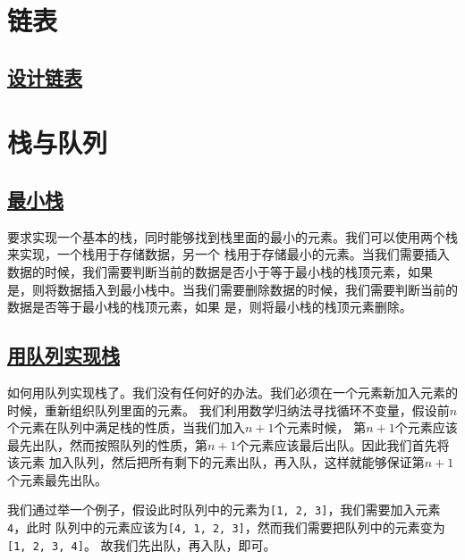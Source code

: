 \documentclass[../../main.tex]{subfiles}
\begin{document}
\section{链表}

\subsection{\href{https://leetcode.cn/problems/design-linked-list/}{设计链表}}



\section{栈与队列}

\subsection{\href{https://leetcode-cn.com/problems/min-stack/}{最小栈}}

要求实现一个基本的栈，同时能够找到栈里面的最小的元素。我们可以使用两个栈来实现，一个栈用于存储数据，另一个
栈用于存储最小的元素。当我们需要插入数据的时候，我们需要判断当前的数据是否小于等于最小栈的栈顶元素，如果
是，则将数据插入到最小栈中。当我们需要删除数据的时候，我们需要判断当前的数据是否等于最小栈的栈顶元素，如果
是，则将最小栈的栈顶元素删除。



\subsection{\href{https://leetcode.cn/problems/implement-stack-using-queues/}{用队列实现栈}}

如何用队列实现栈了。我们没有任何好的办法。我们必须在一个元素新加入元素的时候，重新组织队列里面的元素。
我们利用数学归纳法寻找循环不变量，假设前$n$个元素在队列中满足栈的性质，当我们加入$n + 1$个元素时候，
第$n + 1$个元素应该最先出队，然而按照队列的性质，第$n + 1$个元素应该最后出队。因此我们首先将该元素
加入队列，然后把所有剩下的元素出队，再入队，这样就能够保证第$n + 1$个元素最先出队。

\begin{example}
  我们通过举一个例子，假设此时队列中的元素为\texttt{[1, 2, 3]}，我们需要加入元素\texttt{4}，此时
  队列中的元素应该为\texttt{[4, 1, 2, 3]}，然而我们需要把队列中的元素变为\texttt{[1, 2, 3, 4]}。
  故我们先出队，再入队，即可。
\end{example}
\end{document}
